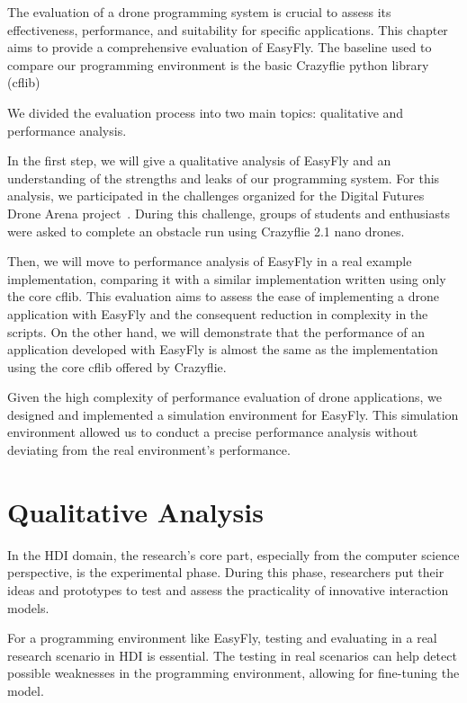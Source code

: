 The evaluation of a drone programming system is crucial to assess its effectiveness, performance, and suitability for specific applications. 
This chapter aims to provide a comprehensive evaluation of EasyFly. 
The baseline used to compare our programming environment is the basic Crazyflie python library (cflib) 

We divided the evaluation process into two main topics: qualitative and performance analysis.

In the first step, we will give a qualitative analysis of EasyFly and an understanding of the strengths and leaks of our programming system.
For this analysis, we participated in the challenges organized for the Digital Futures Drone Arena project~\cite{dronearena}.
During this challenge, groups of students and enthusiasts were asked to complete an obstacle run using Crazyflie 2.1 nano drones.

Then, we will move to performance analysis of EasyFly in a real example implementation, comparing it with a similar implementation written using only the core cflib.
This evaluation aims to assess the ease of implementing a drone application with EasyFly and the consequent reduction in complexity in the scripts. 
On the other hand, we will demonstrate that the performance of an application developed with EasyFly is almost the same as the implementation using the core cflib offered by Crazyflie.

Given the high complexity of performance evaluation of drone applications, we designed and implemented a simulation environment for EasyFly.
This simulation environment allowed us to conduct a precise performance analysis without deviating from the real environment's performance.

\section{Qualitative Analysis}\label{sec:qualitative_analysis}
In the HDI domain, the research's core part, especially from the computer science perspective,
is the experimental phase. During this phase, researchers put their ideas and prototypes to test
and assess the practicality of innovative interaction models.

For a programming environment like EasyFly, testing and evaluating in a real research scenario in HDI is essential. 
The testing in real scenarios can help detect possible weaknesses in the programming environment, allowing for fine-tuning the model.

